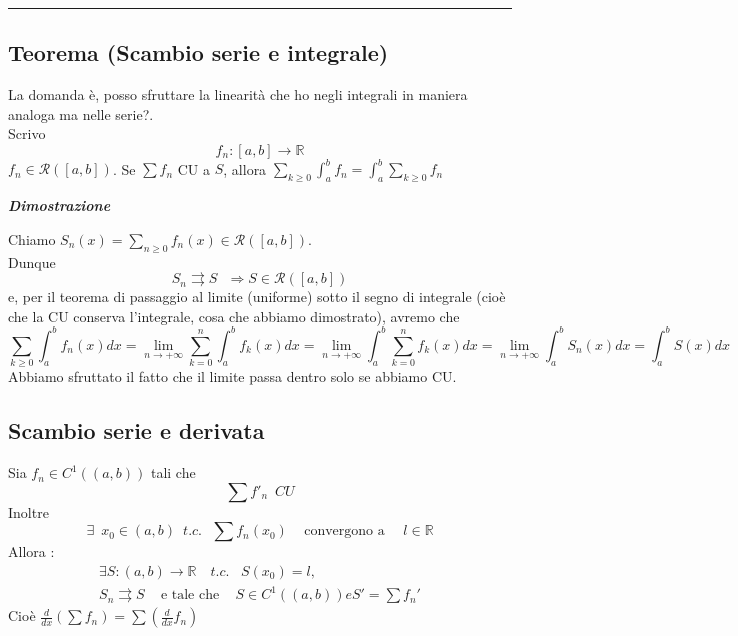 \documentclass{article}
\theoremstyle{definition}
\newcommand{\linea}{\vspace{15pt}\hrule\vspace{15pt}}
\newcommand{\R}{\mathbb{R}}
\begin{document}
\linea 

\subsection{Teorema (Scambio serie e integrale)}
La domanda è, posso sfruttare la linearità che ho negli integrali in maniera analoga ma nelle serie?.
\\
Scrivo
\begin{equation}
    f_n: [a,b] \to \R
\end{equation}
$f_n \in \mathcal{R}([a,b])$. Se $\sum f_n$ CU a $S$, allora $\sum_{k \geqslant 0} \int_a^b f_n= \int_a^b \sum_{k \geqslant 0} f_n$

\begin{center}
    \textbf{\textit{Dimostrazione}}
\end{center}
Chiamo $S_n(x)=\sum_{n \geqslant 0} f_n(x) \in \mathcal{R}([a,b])$.
\\
Dunque
\begin{equation}
    S_n \rightrightarrows S \,\,\,\, \Longrightarrow S \in \mathcal{R}([a,b])
\end{equation}
e, per il teorema di passaggio al limite (uniforme) sotto il segno di integrale (cioè che la CU conserva l'integrale, cosa che abbiamo dimostrato), avremo che
\begin{equation}
    \sum_{k \geqslant 0}\int_a^b f_n(x) dx= \lim_{n \to +\infty} \sum_{k = 0}^n \int_a^b f_k(x) dx = \lim_{n \to +\infty} \int_a^b \sum_{k=0}^n f_k(x) dx= \lim_{n \to +\infty } \int_a^b S_n(x) dx= \int_a^b S(x) dx
\end{equation}
Abbiamo sfruttato il fatto che il limite passa dentro solo se abbiamo CU.
\\
\subsection{Scambio serie e derivata}
Sia $f_n \in C^1\left((a,b)\right)$ tali che 
\begin{equation}
    \sum f'_n \,\,\, CU
\end{equation}
Inoltre
\begin{equation}
 \exists \,\,\, x_0 \in (a,b) \,\,\, t.c.\,\,\,\,   \sum f_n(x_0) \,\,\,\,\,\,\, \mbox{convergono a }\,\,\,\,\,\, l \in \R
\end{equation}
Allora :
\begin{align*}
    \exists S: (a,b) \to \R \,\,\,\,\,\, t.c.\,\,\,\,\, S(x_0)=l, \\
    S_n \rightrightarrows S \,\,\,\,\,\,\, \mbox{e tale che} \,\,\,\,\,\,\, S \in C^1\left((a,b)\right) e S'=\sum f_n'
\end{align*}
Cioè $\frac{d}{dx}\left(\sum f_n\right)=\sum \left(\frac{d}{dx}f_n\right)$
\end{document}
